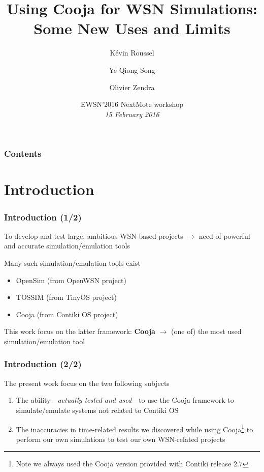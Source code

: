 \documentclass[10pt,c]{beamer}
\title{Using Cooja for WSN Simulations: Some New Uses and Limits}
\author{Kévin Roussel \and Ye-Qiong Song \and Olivier Zendra}
\institute{INRIA Nancy Grand-Est~---
           LORIA UMR~7503~--- Université de Lorraine}
\date{EWSN'2016 NextMote workshop\\
      \textit{15 February 2016}}
\begin{document}
\begin{frame}
\titlepage
\end{frame}


\begin{frame}
\frametitle{Contents}
\tableofcontents
\end{frame}


\section{Introduction}

\begin{frame}
\frametitle{Introduction (1/2)}
\begin{block}{To develop and test large, ambitious WSN-based projects}
$\rightarrow$ need of powerful and accurate simulation/emulation tools
\end{block}
\begin{block}{Many such simulation/emulation tools exist}
\begin{itemize}
\item OpenSim (from OpenWSN project)
\item TOSSIM (from TinyOS project)
\item Cooja (from Contiki OS project)
\end{itemize}
\end{block}
\begin{exampleblock}{This work focus on the latter framework: \textbf{Cooja}}
$\rightarrow$ (one of) the most used simulation/emulation tool
\end{exampleblock}
\end{frame}

\begin{frame}
\frametitle{Introduction (2/2)}
\begin{block}{The present work focus on the two following subjects}
\begin{enumerate}
\item The ability---\emph{actually tested and used}---to use the Cooja
framework to simulate/emulate systems not related to Contiki OS
\item The inaccuracies in time-related results we discovered while using
Cooja\footnote{Note we always used the Cooja version provided with
Contiki release 2.7} to perform our own simulations to test our own
WSN-related projects
\end{enumerate}
\end{block}
\end{frame}
\end{document}
